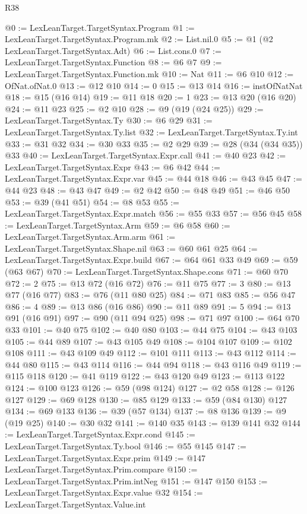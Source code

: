 \begin{lexlean}{R38}
\begin{coremodule}
@0 := LexLeanTarget.TargetSyntax.Program
@1 := LexLeanTarget.TargetSyntax.Program.mk
@2 := List.nil.{0}
@5 := @1 (@2 LexLeanTarget.TargetSyntax.Adt)
@6 := List.cons.{0}
@7 := LexLeanTarget.TargetSyntax.Function
@8 := @6 @7
@9 := LexLeanTarget.TargetSyntax.Function.mk
@10 := Nat
@11 := @6 @10
@12 := OfNat.ofNat.{0}
@13 := @12 @10
@14 := 0
@15 := @13 @14
@16 := instOfNatNat
@18 := @15 (@16 @14)
@19 := @11 @18
@20 := 1
@23 := @13 @20 (@16 @20)
@24 := @11 @23
@25 := @2 @10
@28 := @9 (@19 (@24 @25))
@29 := LexLeanTarget.TargetSyntax.Ty
@30 := @6 @29
@31 := LexLeanTarget.TargetSyntax.Ty.list
@32 := LexLeanTarget.TargetSyntax.Ty.int
@33 := @31 @32
@34 := @30 @33
@35 := @2 @29
@39 := @28 (@34 (@34 @35)) @33
@40 := LexLeanTarget.TargetSyntax.Expr.call
@41 := @40 @23
@42 := LexLeanTarget.TargetSyntax.Expr
@43 := @6 @42
@44 := LexLeanTarget.TargetSyntax.Expr.var
@45 := @44 @18
@46 := @43 @45
@47 := @44 @23
@48 := @43 @47
@49 := @2 @42
@50 := @48 @49
@51 := @46 @50
@53 := @39 (@41 @51)
@54 := @8 @53
@55 := LexLeanTarget.TargetSyntax.Expr.match
@56 := @55 @33
@57 := @56 @45
@58 := LexLeanTarget.TargetSyntax.Arm
@59 := @6 @58
@60 := LexLeanTarget.TargetSyntax.Arm.arm
@61 := LexLeanTarget.TargetSyntax.Shape.nil
@63 := @60 @61 @25
@64 := LexLeanTarget.TargetSyntax.Expr.build
@67 := @64 @61 @33 @49
@69 := @59 (@63 @67)
@70 := LexLeanTarget.TargetSyntax.Shape.cons
@71 := @60 @70
@72 := 2
@75 := @13 @72 (@16 @72)
@76 := @11 @75
@77 := 3
@80 := @13 @77 (@16 @77)
@83 := @76 (@11 @80 @25)
@84 := @71 @83
@85 := @56 @47
@86 := 4
@89 := @13 @86 (@16 @86)
@90 := @11 @89
@91 := 5
@94 := @13 @91 (@16 @91)
@97 := @90 (@11 @94 @25)
@98 := @71 @97
@100 := @64 @70 @33
@101 := @40 @75
@102 := @40 @80
@103 := @44 @75
@104 := @43 @103
@105 := @44 @89
@107 := @43 @105 @49
@108 := @104 @107
@109 := @102 @108
@111 := @43 @109 @49
@112 := @101 @111
@113 := @43 @112
@114 := @44 @80
@115 := @43 @114
@116 := @44 @94
@118 := @43 @116 @49
@119 := @115 @118
@120 := @41 @119
@122 := @43 @120 @49
@123 := @113 @122
@124 := @100 @123
@126 := @59 (@98 @124)
@127 := @2 @58
@128 := @126 @127
@129 := @69 @128
@130 := @85 @129
@133 := @59 (@84 @130) @127
@134 := @69 @133
@136 := @39 (@57 @134)
@137 := @8 @136
@139 := @9 (@19 @25)
@140 := @30 @32
@141 := @140 @35
@143 := @139 @141 @32
@144 := LexLeanTarget.TargetSyntax.Expr.cond
@145 := LexLeanTarget.TargetSyntax.Ty.bool
@146 := @55 @145
@147 := LexLeanTarget.TargetSyntax.Expr.prim
@149 := @147 LexLeanTarget.TargetSyntax.Prim.compare
@150 := LexLeanTarget.TargetSyntax.Prim.intNeg
@151 := @147 @150
@153 := LexLeanTarget.TargetSyntax.Expr.value @32
@154 := LexLeanTarget.TargetSyntax.Value.int

\end{coremodule}
\end{lexlean}
